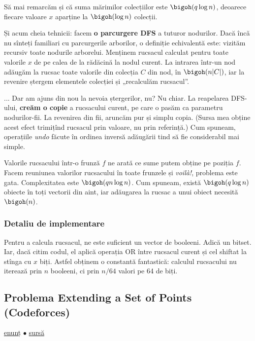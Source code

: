 Să mai remarcăm și că suma mărimilor colecțiilor este $\bigoh(q \log n)$, deoarece fiecare valoare $x$ aparține la $\bigoh(\log n)$ colecții.

Și acum cheia tehnicii: facem \textbf{o parcurgere DFS} a tuturor nodurilor. Dacă încă nu sînteți familiari cu parcurgerile arborilor, o definiție echivalentă este: vizităm recursiv toate nodurile arborelui. Menținem rucsacul calculat pentru toate valorile $x$ de pe calea de la rădăcină la nodul curent. La intrarea într-un nod adăugăm la rucsac toate valorile din colecția $C$ din nod, în $\bigoh(n |C|)$, iar la revenire ștergem elementele colecției și „recalculăm rucsacul”.

... Dar am ajuns din nou la nevoia ștergerilor, nu? Nu chiar. La reapelarea DFS-ului, \textbf{creăm o copie} a rucsacului curent, pe care o pasăm ca parametru nodurilor-fii. La revenirea din fii, aruncăm pur și simplu copia. (Sursa mea obține acest efect trimițînd rucsacul prin valoare, nu prin referință.) Cum spuneam, operațiile \textit{undo} făcute în ordinea inversă adăugării tind să fie considerabil mai simple.

Valorile rucsacului într-o frunză $f$ ne arată ce sume putem obține pe poziția $f$. Facem reuniunea valorilor rucsacului în toate frunzele și \textit{voilà!}, problema este gata. Complexitatea este $\bigoh(qn \log n)$. Cum spuneam, există $\bigoh(q \log n)$ obiecte în toți vectorii din aint, iar adăugarea la rucsac a unui obiect necesită $\bigoh(n)$.

\subsubsection*{Detaliu de implementare}

Pentru a calcula rucsacul, ne este suficient un vector de booleeni. Adică un bitset. Iar, dacă citim codul, el aplică operația OR între rucsacul curent și cel shiftat la stînga cu $x$ biți. Astfel obținem o constantă fantastică: calculul rucsacului nu iterează prin $n$ booleeni, ci prin $n/64$ valori pe 64 de biți.


\subsection{Problema Extending a Set of Points (Codeforces)}
\label{problem:extending-a-set-of-points}

\href{https://codeforces.com/contest/1140/problem/F}{enunț}
$\bullet$
\hyperref[code:extending-a-set-of-points]{sursă}

